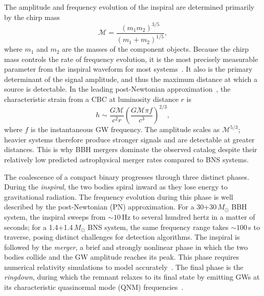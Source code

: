 \begin{refsection}
The amplitude and frequency evolution of the inspiral are determined primarily by the chirp mass
\begin{equation}
    \mathcal{M} = \frac{(m_1 m_2)^{3/5}}{(m_1 + m_2)^{1/5}},
\end{equation}
where $m_1$ and $m_2$ are the masses of the component objects.
Because the chirp mass controls the rate of frequency evolution, it is the most precisely measurable parameter from the inspiral waveform for most systems~\cite{BlEA2002}.
It also is the primary determinant of the signal amplitude, and thus the maximum distance at which a source is detectable.
In the leading post-Newtonian approximation~\cite{2014LRR....17....2B}, the characteristic strain from a CBC at luminosity distance $r$ is
\begin{equation}
    h \sim \frac{G\mathcal{M}}{c^2 r} \left(\frac{G\mathcal{M} \pi f}{c^3}\right)^{2/3},
\end{equation}
where $f$ is the instantaneous GW frequency.
The amplitude scales as $\mathcal{M}^{5/3}$; heavier systems therefore produce stronger signals and are detectable at greater distances.
This is why BBH mergers dominate the observed catalog despite their relatively low predicted astrophysical merger rates compared to BNS systems.

The coalescence of a compact binary progresses through three distinct phases.
During the \emph{inspiral}, the two bodies spiral inward as they lose energy to gravitational radiation.
The frequency evolution during this phase is well described by the post-Newtonian (PN) approximation.
For a 30+30\,$M_\odot$ BBH system, the inspiral sweeps from $\sim 10$\,Hz to several hundred hertz in a matter of seconds; for a 1.4+1.4\,$M_\odot$ BNS system, the same frequency range takes $\sim 100$\,s to traverse, posing distinct challenges for detection algorithms.
The inspiral is followed by the \emph{merger}, a brief and strongly nonlinear phase in which the two bodies collide and the GW amplitude reaches its peak.
This phase requires numerical relativity simulations to model accurately~\cite{Pretorius_2005}.
The final phase is the \emph{ringdown}, during which the remnant relaxes to its final state by emitting GWs at its characteristic quasinormal mode (QNM) frequencies~\cite{PhysRevX.9.041060}.


\end{refsection}
